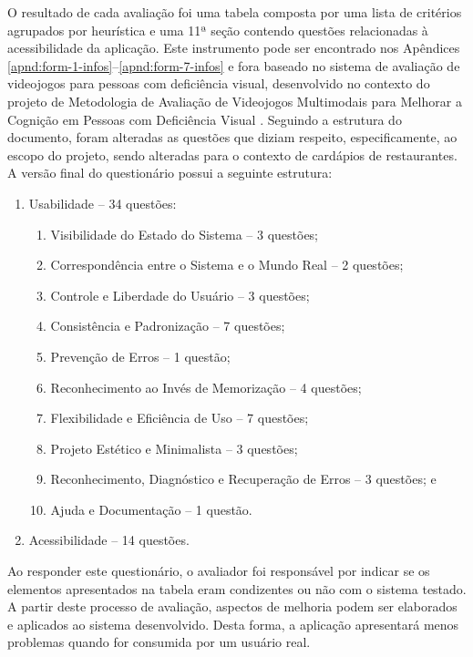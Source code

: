 O resultado de cada avaliação foi uma tabela composta por uma lista de critérios agrupados por heurística e uma 11ª seção contendo questões relacionadas à acessibilidade da aplicação. Este instrumento pode ser encontrado nos Apêndices \ref{apnd:form-1-infos}--\ref{apnd:form-7-infos} e fora baseado no sistema de avaliação de videojogos para pessoas com deficiência visual, desenvolvido no contexto do projeto de Metodologia de Avaliação de Videojogos Multimodais para Melhorar a Cognição em Pessoas com Deficiência Visual \cite{CAMPOS2015}. Seguindo a estrutura do documento, foram alteradas as questões que diziam respeito, especificamente, ao escopo do projeto, sendo alteradas para o contexto de cardápios de restaurantes. A versão final do questionário possui a seguinte estrutura:
\begin{enumerate}
	\item Usabilidade -- 34 questões:
	\begin{enumerate}[label*={\arabic*}]
		\item Visibilidade do Estado do Sistema -- 3 questões;
		\item Correspondência entre o Sistema e o Mundo Real -- 2 questões;
		\item Controle e Liberdade do Usuário -- 3 questões;
		\item Consistência e Padronização -- 7 questões;
		\item Prevenção de Erros -- 1 questão;
		\item Reconhecimento ao Invés de Memorização -- 4 questões;
		\item Flexibilidade e Eficiência de Uso -- 7 questões;
		\item Projeto Estético e Minimalista -- 3 questões;
		\item Reconhecimento, Diagnóstico e Recuperação de Erros -- 3 questões; e
		\item Ajuda e Documentação -- 1 questão.
	\end{enumerate}
	\item Acessibilidade -- 14 questões.
\end{enumerate}

Ao responder este questionário, o avaliador foi responsável por indicar se os elementos apresentados na tabela eram condizentes ou não com o sistema testado. A partir deste processo de avaliação, aspectos de melhoria podem ser elaborados e aplicados ao sistema desenvolvido. Desta forma, a aplicação apresentará menos problemas quando for consumida por um usuário real.

